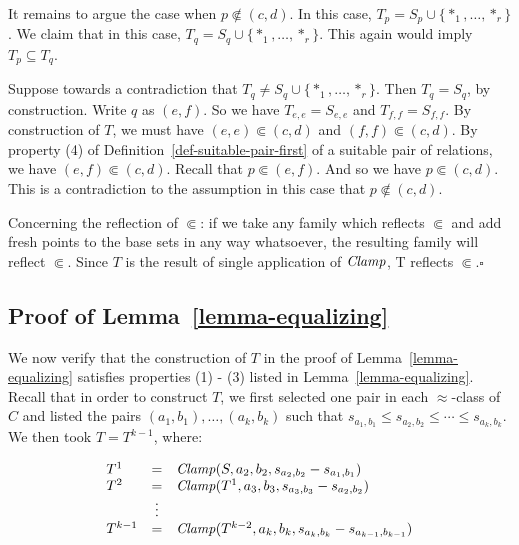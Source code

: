 \documentclass[letterpaper]{article} %
\theoremstyle{definition}
\newcommand{\set}[1]{\{ #1 \}}
\newcommand{\Clamp}{\protect{\mbox{\textit{Clamp}}}}
\newcommand{\precsubseteq}{\Subset}
\begin{document}
It remains to argue the case when
$p \not \precsubseteq (c,d)$.  In this case,  
$T_p =  S_p \cup \set{*_1,\ldots, *_r}$.
We claim that in this case,
$T_q =  S_q \cup \set{*_1,\ldots, *_r}$.
This again would imply $T_p \subseteq T_q$.

Suppose towards a contradiction that 
$T_q \neq  S_q \cup \set{*_1,\ldots, *_r}$.
Then $T_q =  S_q $, by construction.  Write $q$ as $(e, f)$.  So we have $T_{e,e} = S_{e,e}$ and $T_{f,f} = S_{f,f}$.
By construction of $T$, we must have $(e,e)\precsubseteq (c, d)$
and   $(f,f)\precsubseteq (c, d)$.
By property (4) of Definition~\ref{def-suitable-pair-first} of a suitable pair of relations, we have $(e,f)\precsubseteq (c, d)$.
Recall that 
$p \precsubseteq (e,f)$. 
And so we have $p \precsubseteq (c, d)$. 
This is a contradiction to the assumption in this case that 
$p \not \precsubseteq (c, d)$.

Concerning the reflection of $\precsubseteq$:
 if we take any family which reflects $\precsubseteq$ and
add fresh points to the base sets
in any way whatsoever, the resulting family will reflect $\precsubseteq$.  Since $T$ is the result of single application of $\Clamp$, T reflects $\precsubseteq$.\hfill$\square$


\subsection*{Proof of Lemma~\ref{lemma-equalizing}}

We now verify that the construction of $T$ in the proof of Lemma~\ref{lemma-equalizing} satisfies properties (1) - (3) listed in Lemma~\ref{lemma-equalizing}.
Recall that in order to construct $T$, we first selected one pair in each $\approx$-class of $C$ and listed the pairs $(a_1, b_1), \ldots, (a_k, b_k)$ such that $s_{a_1, b_1} \leq s_{a_2, b_2} \leq \cdots \leq s_{a_k, b_k}$.  We then took $T = T^{k-1}$, where:

\[ \begin{array}{lcl}
 T^1  & = &  \Clamp(S,a_2,b_2,s_{a_2, b_2} - s_{a_1, b_1})\\
T^2 & = & \Clamp(T^1,a_3, b_3, s_{a_3, b_3} - s_{a_2, b_2} )\\
  & \vdots   & \\
T^{k-1} & = & \Clamp(T^{k-2},a_k,b_k,
s_{a_k, b_k} - s_{a_{k-1}, b_{k-1}})\\
\end{array}
\]
\end{document}
